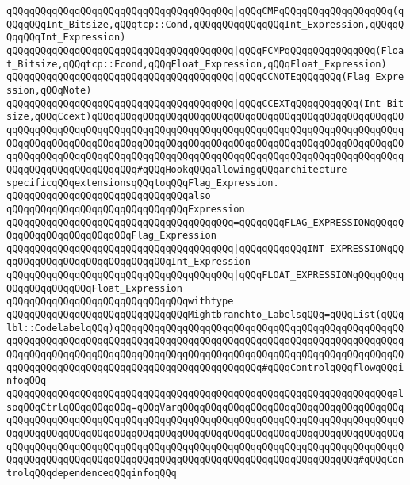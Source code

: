 \verb|qQQqqQQqqQQqqQQqqQQqqQQqqQQqqQQqqQQqqQQq|\verb#|qQQqCMPqQQqqQQqqQQqqQQqqQQq(qQQqqQQqInt_Bitsize,qQQqtcp::Cond,qQQqqQQqqQQqqQQqInt_Expression,qQQqqQQqqQQqInt_Expression)#\newline
\verb|qQQqqQQqqQQqqQQqqQQqqQQqqQQqqQQqqQQqqQQq|\verb#|qQQqFCMPqQQqqQQqqQQqqQQq(Float_Bitsize,qQQqtcp::Fcond,qQQqFloat_Expression,qQQqFloat_Expression)#\newline
\verb|qQQqqQQqqQQqqQQqqQQqqQQqqQQqqQQqqQQqqQQq|\verb#|qQQqCCNOTEqQQqqQQq(Flag_Expression,qQQqNote)#\newline
\verb|qQQqqQQqqQQqqQQqqQQqqQQqqQQqqQQqqQQqqQQq|\verb#|qQQqCCEXTqQQqqQQqqQQq(Int_Bitsize,qQQqCcext)qQQqqQQqqQQqqQQqqQQqqQQqqQQqqQQqqQQqqQQqqQQqqQQqqQQqqQQqqQQqqQQqqQQqqQQqqQQqqQQqqQQqqQQqqQQqqQQqqQQqqQQqqQQqqQQqqQQqqQQqqQQqqQQqqQQqqQQqqQQqqQQqqQQqqQQqqQQqqQQqqQQqqQQqqQQqqQQqqQQqqQQqqQQqqQQqqQQqqQQqqQQqqQQqqQQqqQQqqQQqqQQqqQQqqQQqqQQqqQQqqQQqqQQqqQQqqQQqqQQqqQQqqQQqqQQqqQQqqQQqqQQqqQQq#\verb|#qQQqHookqQQqallowingqQQqarchitecture-specificqQQqextensionsqQQqtoqQQqFlag_Expression.|\newline
\newline
\verb|qQQqqQQqqQQqqQQqqQQqqQQqqQQqqQQqalso|\newline
\verb|qQQqqQQqqQQqqQQqqQQqqQQqqQQqqQQqExpression|\newline
\verb|qQQqqQQqqQQqqQQqqQQqqQQqqQQqqQQqqQQqqQQq=qQQqqQQqFLAG_EXPRESSIONqQQqqQQqqQQqqQQqqQQqqQQqqQQqFlag_Expression|\newline
\verb|qQQqqQQqqQQqqQQqqQQqqQQqqQQqqQQqqQQqqQQq|\verb#|qQQqqQQqqQQqINT_EXPRESSIONqQQqqQQqqQQqqQQqqQQqqQQqqQQqqQQqInt_Expression#\newline
\verb|qQQqqQQqqQQqqQQqqQQqqQQqqQQqqQQqqQQqqQQq|\verb#|qQQqFLOAT_EXPRESSIONqQQqqQQqqQQqqQQqqQQqqQQqFloat_Expression#\newline
\newline
\verb|qQQqqQQqqQQqqQQqqQQqqQQqqQQqqQQqwithtype|\newline
\verb|qQQqqQQqqQQqqQQqqQQqqQQqqQQqqQQqMightbranchto_LabelsqQQq=qQQqList(qQQqlbl::CodelabelqQQq)qQQqqQQqqQQqqQQqqQQqqQQqqQQqqQQqqQQqqQQqqQQqqQQqqQQqqQQqqQQqqQQqqQQqqQQqqQQqqQQqqQQqqQQqqQQqqQQqqQQqqQQqqQQqqQQqqQQqqQQqqQQqqQQqqQQqqQQqqQQqqQQqqQQqqQQqqQQqqQQqqQQqqQQqqQQqqQQqqQQqqQQqqQQqqQQqqQQqqQQqqQQqqQQqqQQqqQQqqQQqqQQqqQQqqQQqqQQq#qQQqControlqQQqflowqQQqinfoqQQq|\newline
\verb|qQQqqQQqqQQqqQQqqQQqqQQqqQQqqQQqqQQqqQQqqQQqqQQqqQQqqQQqqQQqqQQqqQQqalsoqQQqCtrlqQQqqQQqqQQq=qQQqVarqQQqqQQqqQQqqQQqqQQqqQQqqQQqqQQqqQQqqQQqqQQqqQQqqQQqqQQqqQQqqQQqqQQqqQQqqQQqqQQqqQQqqQQqqQQqqQQqqQQqqQQqqQQqqQQqqQQqqQQqqQQqqQQqqQQqqQQqqQQqqQQqqQQqqQQqqQQqqQQqqQQqqQQqqQQqqQQqqQQqqQQqqQQqqQQqqQQqqQQqqQQqqQQqqQQqqQQqqQQqqQQqqQQqqQQqqQQqqQQqqQQqqQQqqQQqqQQqqQQqqQQqqQQqqQQqqQQqqQQqqQQqqQQqqQQqqQQqqQQqqQQqqQQqqQQq#qQQqControlqQQqdependenceqQQqinfoqQQq|\newline
